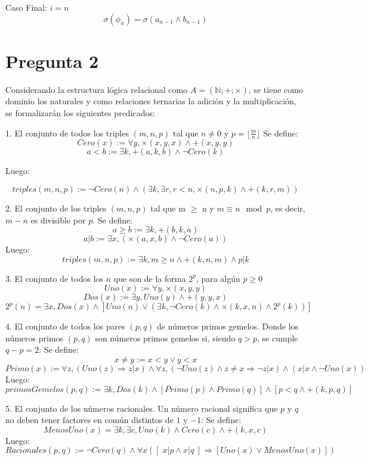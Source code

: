\documentclass[
	spanish, %
	letterpaper, oneside
]{article}
\begin{document}
Caso Final: $i = n$
\begin{equation}
    \sigma(\phi_n) = \sigma(a_{n-1}\land b_{n-1})
\end{equation}


\newpage
\section*{Pregunta 2}

Considerando la estructura lógica relacional como $A=(\mathbb{N};+;\times)$, se tiene como dominio los naturales y como relaciones ternarias la adición y la multiplicación, se formalizarán los siguientes predicados:

1. El conjunto de todos los triples $(m,n,p)$ tal que $n\neq 0$ y $p = \lfloor \frac{m}{n}\rfloor$
Se define:
$$Cero(x):=\forall y, \times(x,y,x) \land +(x,y,y)$$
$$a<b := \exists k, +(a,k,b)\land \neg Cero(k)$$

Luego:

$$triples(m,n,p):=\neg Cero(n) \land (\exists k, \exists r, r<n, \times(n,p,k) \land +(k,r,m))$$

2. El conjunto de los triples $(m,n,p)$ tal que m $\geq$ n y $m \equiv n \mod p$, es decir, $m-n$ es divisible por $p$.
Se define:
$$a\geq b := \exists k, +(b,k,a)$$    %
 $$a|b := \exists x,(\times(a,x,b)\land \neg Cero(a))$$
 Luego:
 $$triples(m,n,p):= \exists k, m\geq n \land +(k,n,m) \land p|k$$


 3. El conjunto de todos los $n$ que son de la forma $2^p$, para algún $p\geq 0$
 $$Uno(x):=\forall y, \times(x,y,y)$$
 $$Dos(x):=\exists y, Uno(y) \land +(y,y,x)$$
 $$2^p(n)= \exists x, Dos(x) \land [Uno(n)\vee (\exists k,\neg Cero(k) \land \times(k,x,n)\land 2^p(k))]$$

 4. El conjunto de todos los pares $(p,q)$ de números primos gemelos. Donde los números primos $(p,q)$ son números primos gemelos si, siendo $q>p$, se cumple $q-p=2$:
Se define:
$$x \neq y := x < y \vee y < x$$
$$Primo(x):=\forall z,(Uno(z) \Rightarrow z|x ) \wedge \forall z, (\neg Uno(z)\wedge z\neq x \Rightarrow \neg z|x ) \wedge (x|x \wedge \neg Uno(x))$$
Luego:
 $$primosGemelos(p,q) := \exists k, Dos(k) \land [Primo(p) \land Primo(q)] \land [p < q \land +(k,p,q)]$$



 5. El conjunto de los números racionales. Un número racional significa que $p$ y $q$ no deben tener factores en común distintos de $1$ y $-1$:
Se define:
$$MenosUno(x) = \exists k,\exists c, Uno(k) \land Cero(c) \land +(k,x,c)$$
Luego:
$$Racionales(p, q) := \neg Cero(q) \land \forall x([\;x|p \land x|q\;] \Rightarrow [Uno(x)\vee 
 MenosUno(x)])$$
\end{document}
